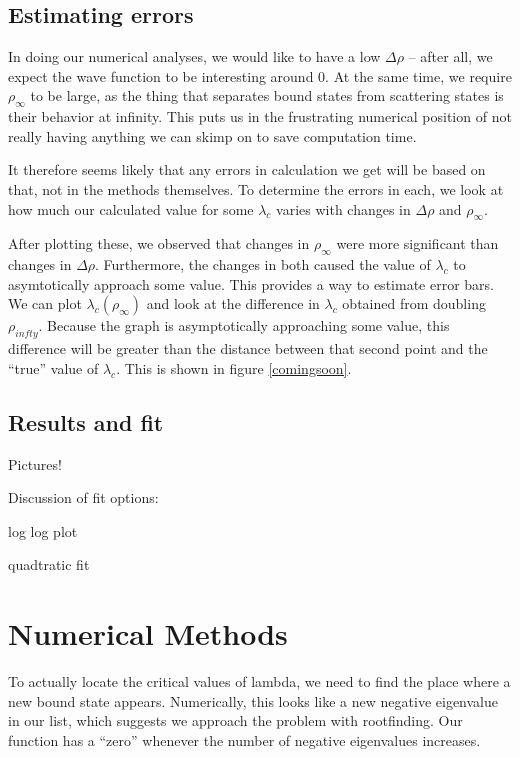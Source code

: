 \documentclass[12pt,twoside]{reedthesis}
\begin{document}
\section{Estimating errors}
In doing our numerical analyses, we would like to have a low $\Delta \rho$ -- after all, we expect the wave function to be interesting around 0. At the same time, we require $\rho_{\infty}$ to be large, as the thing that separates bound states from scattering states is their behavior at infinity. This puts us in the frustrating numerical position of not really having anything we can skimp on to save computation time.

It therefore seems likely that any errors in calculation we get will be based on that, not in the methods themselves. To determine the errors in each, we look at how much our calculated value for some $\lambda_{c}$ varies with changes in $\Delta \rho$ and $\rho_{\infty}$.

After plotting these, we observed that changes in $\rho_{\infty}$ were more significant than changes in $\Delta \rho$. Furthermore, the changes in both caused the value of $\lambda_{c}$ to asymtotically approach some value. This provides a way to estimate error bars. We can plot $\lambda_c(\rho_{\infty})$ and look at the difference in $\lambda_c$ obtained from doubling $\rho_{infty}$. Because the graph is asymptotically approaching some value, this difference will be greater than the distance between that second point and the ``true'' value of $\lambda_c$. This is shown in figure \ref{comingsoon}.

\section{Results and fit}
Pictures!

Discussion of fit options:

log log plot

quadtratic fit


%
%
%	
%
\appendix
\chapter{Numerical Methods}
To actually locate the critical values of lambda, we need to find the place where a new bound state appears. Numerically, this looks like a new negative eigenvalue in our list, which suggests we approach the problem with rootfinding. Our function has a ``zero'' whenever the number of negative eigenvalues increases.
\end{document}
